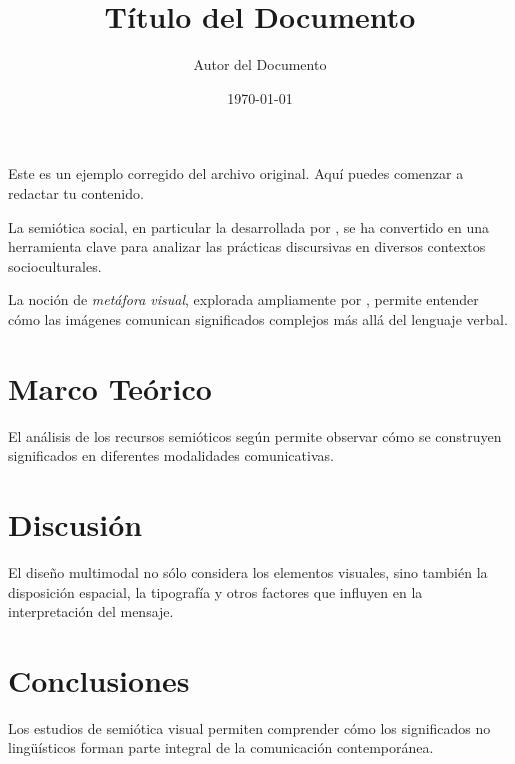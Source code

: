 \documentclass[12pt]{article}
\title{Título del Documento}
\author{Autor del Documento}
\date{\today}
\begin{document}
\maketitle

Este es un ejemplo corregido del archivo original. Aquí puedes comenzar a redactar tu contenido.

La semiótica social, en particular la desarrollada por \citet{Halliday2004}, se ha convertido en una herramienta clave para analizar las prácticas discursivas en diversos contextos socioculturales.

La noción de \textit{metáfora visual}, explorada ampliamente por \citet{Forceville1996}, permite entender cómo las imágenes comunican significados complejos más allá del lenguaje verbal.

\section{Marco Teórico}

El análisis de los recursos semióticos según \citet{KressVanLeeuwen2006} permite observar cómo se construyen significados en diferentes modalidades comunicativas.

\section{Discusión}

El diseño multimodal no sólo considera los elementos visuales, sino también la disposición espacial, la tipografía y otros factores que influyen en la interpretación del mensaje.

\section{Conclusiones}

Los estudios de semiótica visual permiten comprender cómo los significados no lingüísticos forman parte integral de la comunicación contemporánea.



\end{document}
